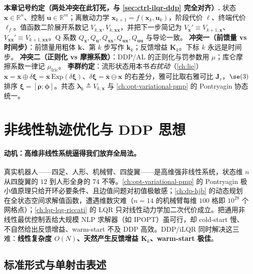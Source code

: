\begin{note}
\textbf{本章记号约定（两处冲突在此钉死，与 \cref{sec:ctrl-ilqr-ddp} 完全对齐）.}\;
状态 $\mathbf{x}\in\mathbb{R}^n$、控制 $\mathbf{u}\in\mathbb{R}^m$；离散动力学 $\mathbf{x}_{k+1}=f(\mathbf{x}_k,\mathbf{u}_k)$，阶段代价 $\ell$、终端代价 $\ell_f$。值函数二阶展开系数记 $V_{k,\mathbf{x}},V_{k,\mathbf{xx}}$，并把下一步简记为 $V_{\mathbf{x}}'\equiv V_{k+1,\mathbf{x}}$、$V_{\mathbf{xx}}'\equiv V_{k+1,\mathbf{xx}}$。Q 系数 $Q_{\mathbf{x}},Q_{\mathbf{u}},Q_{\mathbf{xx}},Q_{\mathbf{ux}},Q_{\mathbf{uu}}$ 与导论一致。
\textbf{冲突一（前馈量 vs 时间步）}：前馈量用粗体 $\mathbf{k}$、第 $k$ 步写作 $\mathbf{k}_k$；反馈增益 $\mathbf{K}_k$。下标 $k$ 永远是时间步。
\textbf{冲突二（正则化 vs 摩擦系数）}：DDP/AL 的正则化与罚参数用 $\mu$；库仑摩擦系数一律记 $\mu_{\mathrm{fric}}$。
\textbf{李群约定}：流形状态用本书\emph{右扰动}（\cref{ch:lie}）$\mathbf{x}=\bar{\mathbf{x}}\oplus\delta\boldsymbol{\xi}=\bar{\mathbf{x}}\,\mathrm{Exp}(\delta\boldsymbol{\xi})$、$\delta\boldsymbol{\xi}=\bar{\mathbf{x}}\ominus\mathbf{x}$ 的右差分，雅可比取右雅可比 $\mathbf{J}_r$，$\se(3)$ 排序 $\boldsymbol{\xi}=[\boldsymbol{\rho};\boldsymbol{\phi}]$。共态 $\boldsymbol{\lambda}_k\triangleq V_{k,\mathbf{x}}$ 与 \cref{ch:opt-variational-pmp} 的 Pontryagin 协态统一。
\end{note}

\section{非线性轨迹优化与 DDP 思想}
\label{sec:ddp-thought}

\paragraph{动机：高维非线性系统逼得我们放弃全局法。}
真实机器人——四足、人形、机械臂、四旋翼——是高维强非线性系统，状态维 $n$ 从四旋翼的 $12$ 到人形全身的 $74$ 不等。\cref{ch:opt-variational-pmp} 的 Pontryagin 极小值原理只给开环必要条件、且边值问题对初值极敏感；\cref{ch:dp-hjb} 的动态规划在全状态空间求解值函数，遭遇维数灾难（$n=14$ 的机械臂每维 $100$ 格即 $10^{28}$ 个网格点）；\cref{ch:lqr-lqg-riccati} 的 LQR 只对线性动力学加二次代价成立。把通用非线性最优控制丢给大规模 NLP 求解器（如 IPOPT）虽可行，却 cold-start 慢、不自然给出反馈增益、warm-start 不及 DDP 高效。DDP/iLQR 同时解决这三难：\textbf{线性复杂度 $O(N)$、天然产生反馈增益 $\mathbf{K}_k$、warm-start 极佳}。

\subsection{标准形式与单射击表述}
\label{sec:ddp-ocp}

